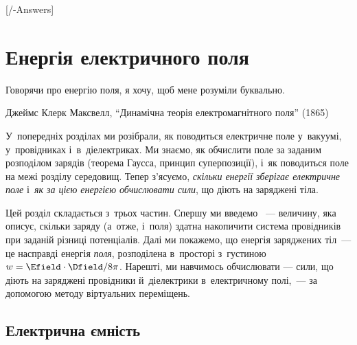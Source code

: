 


[\currfilebase/\currfilebase-Answers]
\chapter{Енергія електричного поля}\label{\currfilebase}\hypertarget{ElEnergy}{}
\graphicspath{{\currfilebase/Pictures}}
\epigraph{\Alexander Говорячи про енергію поля, я хочу, щоб мене розуміли буквально.}{Джеймс
Клерк Максвелл, \enquote{Динамічна теорія електромагнітного поля} (1865)}

У~попередніх розділах ми розібрали, як поводиться електричне поле у~вакуумі, у~провідниках
і~в~діелектриках. Ми знаємо, як обчислити поле за заданим розподілом зарядів (теорема
Гаусса, принцип суперпозиції), і~як поводиться поле на межі розділу середовищ. Тепер з'ясуємо,
\emph{скільки енергії зберігає електричне поле} і~\emph{як за цією енергією обчислювати
сили}, що діють на заряджені тіла.

Цей розділ складається з~трьох частин. Спершу ми введемо ~---
величину, яка описує, скільки заряду (а~отже, і~поля) здатна накопичити система
провідників при заданій різниці потенціалів. Далі ми покажемо, що енергія заряджених
тіл~--- це насправді енергія \emph{поля}, розподілена в~просторі з~густиною $w =
\Efield\cdot\Dfield/8\pi$. Нарешті, ми навчимось обчислювати 
--- сили, що діють на заряджені провідники й~діелектрики в~електричному полі,~--- за
допомогою методу віртуальних переміщень.


\section{Електрична ємність}\hypertarget{electric-capacitance}{}


